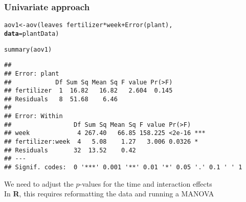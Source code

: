 \documentclass[color=usenames,dvipsnames]{beamer}\usepackage[]{graphicx}\usepackage[]{color}
\makeatletter
\newcommand{\hlopt}[1]{\textcolor[rgb]{0,0,0}{#1}}%
\newcommand{\hlstd}[1]{\textcolor[rgb]{0,0,0}{#1}}%
\newcommand{\hlkwb}[1]{\textcolor[rgb]{0,0.341,0.682}{#1}}%
\newcommand{\hlkwc}[1]{\textcolor[rgb]{0,0,0}{\textbf{#1}}}%
\newcommand{\hlkwd}[1]{\textcolor[rgb]{0.004,0.004,0.506}{#1}}%
\newenvironment{kframe}{%
 \def\at@end@of@kframe{}%
 \ifinner\ifhmode%
  \def\at@end@of@kframe{\end{minipage}}%
  \begin{minipage}{\columnwidth}%
 \fi\fi%
 \def\FrameCommand##1{\hskip\@totalleftmargin \hskip-\fboxsep
 \colorbox{shadecolor}{##1}\hskip-\fboxsep
     \hskip-\linewidth \hskip-\@totalleftmargin \hskip\columnwidth}%
 \MakeFramed {\advance\hsize-\width
   \@totalleftmargin\z@ \linewidth\hsize
   \@setminipage}}%
 {\par\unskip\endMakeFramed%
 \at@end@of@kframe}
\newenvironment{knitrout}{}{} %
\makeatother
\begin{document}



\begin{frame}[fragile]
  \frametitle{Univariate approach}
  \scriptsize
\begin{knitrout}\scriptsize
{}\color{fgcolor}\begin{kframe}
\begin{alltt}
\hlstd{aov1} \hlkwb{<-} \hlkwd{aov}\hlstd{(leaves} \hlopt{~} \hlstd{fertilizer}\hlopt{*}\hlstd{week} \hlopt{+} \hlkwd{Error}\hlstd{(plant),}
            \hlkwc{data}\hlstd{=plantData)}
\end{alltt}
\end{kframe}
\end{knitrout}
\pause
\begin{knitrout}\scriptsize
{}\color{fgcolor}\begin{kframe}
\begin{alltt}
\hlkwd{summary}\hlstd{(aov1)}
\end{alltt}
\begin{verbatim}
## 
## Error: plant
##            Df Sum Sq Mean Sq F value Pr(>F)
## fertilizer  1  16.82   16.82   2.604  0.145
## Residuals   8  51.68    6.46               
## 
## Error: Within
##                 Df Sum Sq Mean Sq F value Pr(>F)    
## week             4 267.40   66.85 158.225 <2e-16 ***
## fertilizer:week  4   5.08    1.27   3.006 0.0326 *  
## Residuals       32  13.52    0.42                   
## ---
## Signif. codes:  0 '***' 0.001 '**' 0.01 '*' 0.05 '.' 0.1 ' ' 1
\end{verbatim}
\end{kframe}
\end{knitrout}
\pause
\footnotesize
We need to adjust the $p$-values for the time and interaction effects \\
\pause
\vfill
In {\bf R}, this requires reformatting the data and running a MANOVA
\end{frame}
\end{document}
